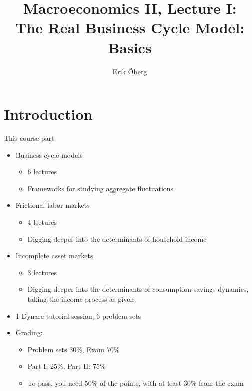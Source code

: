 \documentclass[9pt,xcolor={dvipsnames}]{beamer}
\title[The Real Business Cycle Model: Basics]{Macroeconomics II, Lecture I:\\
	  The Real Business Cycle Model: Basics}
\author{Erik {\"O}berg}
\date{}
\newcommand{\bit}{\begin{itemize}}
\newcommand{\eit}{\end{itemize}}
\begin{document}
\begin{frame}
\maketitle
\end{frame}

\section{Introduction}


\begin{frame}{This course part}

\bit
\setlength\itemsep{1em}

\item Business cycle models
\bit
\setlength\itemsep{0.5em}
	\item 6 lectures
	\item Frameworks for studying aggregate fluctuations
\eit


\item Frictional labor markets
\bit
\setlength\itemsep{0.5em}
	\item 4 lectures
	\item Digging deeper into the determinants of household income
\eit

\item Incomplete asset markets 
\bit
\setlength\itemsep{0.5em}
	\item 3 lectures
	\item Digging deeper into the determinants of consumption-savings dynamics, taking the income process as given
\eit

\item 1 Dynare tutorial session; 6 problem sets

\item Grading: 
\bit
\item Problem sets 30\%, Exam 70\%
\item Part I: 25\%, Part II: 75\%
\item To pass, you need 50\% of the points, with at least 30\% from the exam
\eit

\eit

\end{frame}
\end{document}
